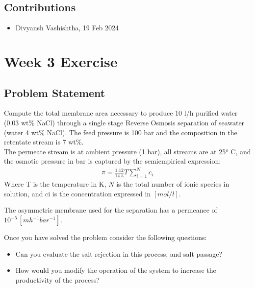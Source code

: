 \documentclass[letterpaper,10pt,english]{jupyterBook}
\begin{document}
\subsection{Contributions}
\label{\detokenize{Exercise_W2_2025:contributions}}\begin{itemize}
\item {} 
\sphinxAtStartPar
Divyansh Vashishtha, 19 Feb 2024

\end{itemize}

\sphinxstepscope


\section{Week 3 \sphinxhyphen{} Exercise}
\label{\detokenize{Exercise_W3_2021:week-3-exercise}}\label{\detokenize{Exercise_W3_2021::doc}}

\subsection{Problem Statement}
\label{\detokenize{Exercise_W3_2021:problem-statement}}
\sphinxAtStartPar
Compute the total membrane area necessary to produce 10 l/h purified water (0.03 wt\% NaCl) through a single stage Reverse Osmosis separation of seawater (water 4 wt\% NaCl).
The feed pressure is 100 bar and the composition in the retentate stream is 7 wt\%.\\
The permeate stream is at ambient pressure (1 bar), all streams are at 25\(^o\) C, and the osmotic pressure in bar is captured by the semiempirical expression:
\begin{equation*}
\begin{split}
\pi=\frac{1.12}{14.5}T\sum_{i=1}^Nc_i
\end{split}
\end{equation*}
\sphinxAtStartPar
Where T is the temperature in K,  \(N\) is the total number of ionic species in solution, and ci is the concentration expressed in \([mol/l]\).

\sphinxAtStartPar
The asymmetric membrane used for the separation has a permeance of \(10^{-5}\,[m h^{-1} bar^{-1}]\).

\sphinxAtStartPar
Once you have solved the problem consider the following questions:
\begin{itemize}
\item {} 
\sphinxAtStartPar
Can you evaluate the salt rejection in this process, and salt passage?

\item {} 
\sphinxAtStartPar
How would you modify the operation of the system to increase the productivity of the process?

\end{itemize}
\end{document}
